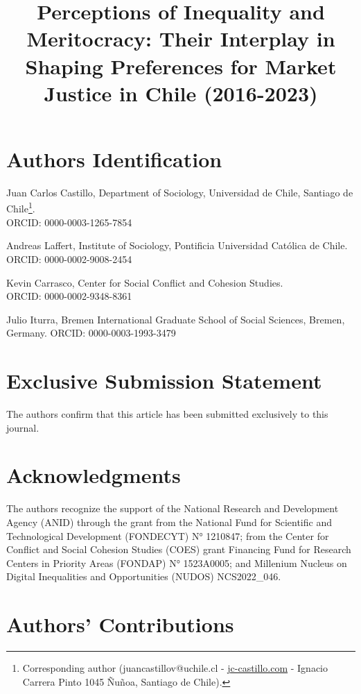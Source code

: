 \documentclass[
  12pt,
]{article}
\title{Perceptions of Inequality and Meritocracy: Their Interplay in
Shaping Preferences for Market Justice in Chile (2016-2023)}
\date{}
\begin{document}
\maketitle

\section{Authors Identification}\label{authors-identification}

Juan Carlos Castillo, Department of Sociology, Universidad de Chile,
Santiago de Chile\footnote{Corresponding author (juancastillov@uchile.cl
  -
  \href{https://juancarloscastillo.github.io/jc-castillo/}{jc-castillo.com}
  - Ignacio Carrera Pinto 1045 Ñuñoa, Santiago de Chile).}.\\
ORCID: 0000-0003-1265-7854

Andreas Laffert, Institute of Sociology, Pontificia Universidad Católica
de Chile.\\
ORCID: 0000-0002-9008-2454

Kevin Carrasco, Center for Social Conflict and Cohesion Studies.\\
ORCID: 0000-0002-9348-8361

Julio Iturra, Bremen International Graduate School of Social Sciences,
Bremen, Germany. ORCID: 0000-0003-1993-3479

\section{Exclusive Submission
Statement}\label{exclusive-submission-statement}

The authors confirm that this article has been submitted exclusively to
this journal.

\section{Acknowledgments}\label{acknowledgments}

The authors recognize the support of the National Research and
Development Agency (ANID) through the grant from the National Fund for
Scientific and Technological Development (FONDECYT) N° 1210847; from the
Center for Conflict and Social Cohesion Studies (COES) grant Financing
Fund for Research Centers in Priority Areas (FONDAP) N° 1523A0005; and
Millenium Nucleus on Digital Inequalities and Opportunities (NUDOS)
NCS2022\_046.

\section{Authors' Contributions}\label{authors-contributions}
\end{document}
